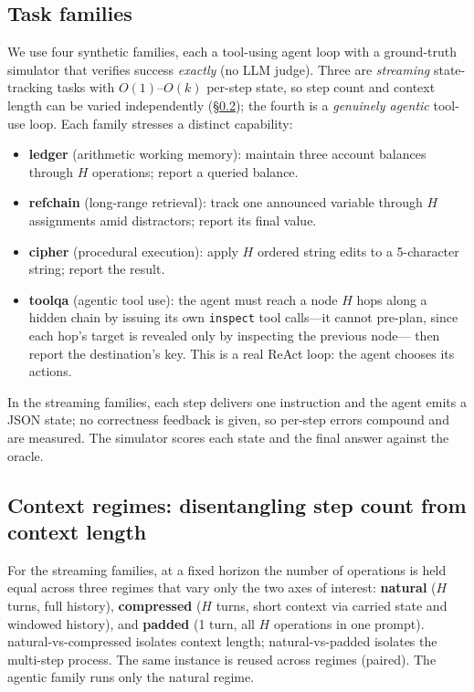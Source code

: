 \documentclass[11pt]{article}
\newcommand{\horizon}{H}
\begin{document}
\subsection{Task families}
We use four synthetic families, each a tool-using agent loop with a ground-truth
simulator that verifies success \emph{exactly} (no LLM judge). Three are
\emph{streaming} state-tracking tasks with $O(1)$--$O(k)$ per-step state, so step count
and context length can be varied independently (\S\ref{sec:regimes}); the fourth is a
\emph{genuinely agentic} tool-use loop. Each family stresses a distinct capability:
\begin{itemize}
\item \textbf{ledger} (arithmetic working memory): maintain three account balances
  through $\horizon$ operations; report a queried balance.
\item \textbf{refchain} (long-range retrieval): track one announced variable through
  $\horizon$ assignments amid distractors; report its final value.
\item \textbf{cipher} (procedural execution): apply $\horizon$ ordered string edits to
  a 5-character string; report the result.
\item \textbf{toolqa} (agentic tool use): the agent must reach a node $\horizon$ hops
  along a hidden chain by issuing its own \texttt{inspect} tool calls---it cannot
  pre-plan, since each hop's target is revealed only by inspecting the previous node---
  then report the destination's key. This is a real ReAct loop: the agent chooses its
  actions.
\end{itemize}
In the streaming families, each step delivers one instruction and the agent emits a
JSON state; no correctness feedback is given, so per-step errors compound and are
measured. The simulator scores each state and the final answer against the oracle.

\subsection{Context regimes: disentangling step count from context length}\label{sec:regimes}
For the streaming families, at a fixed horizon the number of operations is held equal
across three regimes that vary only the two axes of interest: \textbf{natural}
($\horizon$ turns, full history), \textbf{compressed} ($\horizon$ turns, short context
via carried state and windowed history), and \textbf{padded} (1 turn, all $\horizon$
operations in one prompt). natural-vs-compressed isolates context length;
natural-vs-padded isolates the multi-step process. The same instance is reused across
regimes (paired). The agentic family runs only the natural regime.
\end{document}
